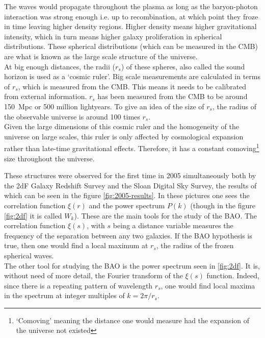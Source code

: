 The waves would propagate throughout the plasma as long as the baryon-photon interaction was strong enough i.e. up to recombination, at which point they froze in time leaving higher density regions. Higher density means higher gravitational intensity, which in turn means higher galaxy proliferation in spherical distributions. These spherical distributions (which can be measured in the CMB) are what is known as the large scale structure of the universe. \\

At big enough distances, the radii ($r_s$) of these spheres, also called the sound horizon is used as a `cosmic ruler'. Big scale measurements are calculated in terms of $r_s$, which is measured from the CMB. This means it needs to be calibrated from external information. $ r_s$ has been measured from the CMB to be around  \SI{150}{Mpc} or 500 million lightyears.
To give an idea of the size of $r_s$, the radius of the observable universe is around 100 times $r_s$. \\

Given the large dimensions of this cosmic ruler and the homogeneity of the universe on large scales, this ruler is only affected by cosmological expansion rather than late-time gravitational effects. Therefore, it has a constant comoving\footnote{`Comoving' meaning the distance one would measure had the expansion of the universe not existed} size throughout the universe.

These structures were observed for the first time in 2005 simultaneously both by the 2dF Galaxy Redshift Survey\cite{2dFCole2005} and the Sloan Digital Sky Survey\cite{Eisenstein2005}, the results of which can be seen in the figure \ref{fig:2005-results}. In these pictures one sees the correlation function  $\xi(r)$ and the power spectrum $P(k)$ (though in the figure \ref{fig:2df} it is called $W_k$). These are the main tools for the study of the BAO.
The correlation function $\xi(s)$, with $s$ being a distance variable measures the frequency of the separation between any two galaxies. If the BAO hypothesis is true, then one would find a local maximum at $r_s$, the radius of the frozen spherical waves. \\

The other tool for studying the BAO is the power spectrum seen in \ref{fig:2df}. It is, without need of more detail, the Fourier transform of the $\xi(s)$ function. Indeed, since there is a repeating pattern of wavelength $r_s$, one would find local maxima in the spectrum at integer multiples of $k = 2\pi /r_s$. \\

